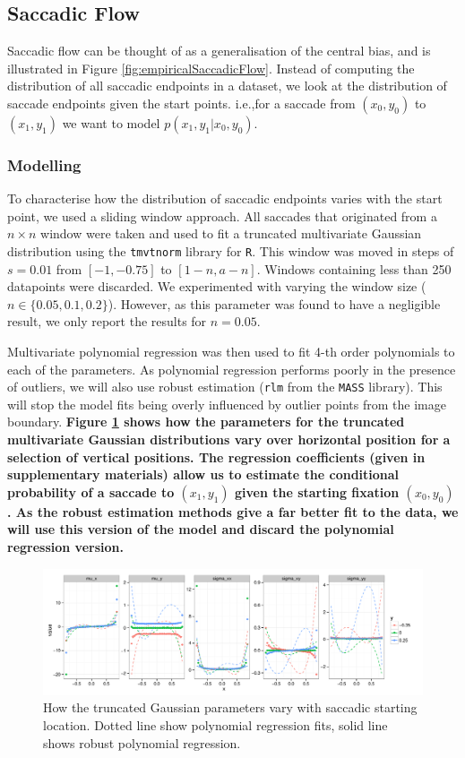 \documentclass[a4paper, twocolumn, oneside, 11pt]{article}
\begin{document}
\subsection{Saccadic Flow}
\label{ModellingFlow}

Saccadic flow can be thought of as a generalisation of the central bias, and is illustrated in Figure \ref{fig:empiricalSaccadicFlow}. Instead of computing the distribution of all saccadic endpoints in a dataset, we look at the distribution of saccade endpoints given the start points. i.e.,for a saccade from $(x_0, y_0)$ to $(x_1, y_1)$ we want to model $p(x_1,y_1|x_0, y_0)$.

\subsubsection{Modelling}

To characterise how the distribution of saccadic endpoints varies with the start point, we used a sliding window approach. All saccades that originated from a $n\times n$ window were taken and used to fit a truncated multivariate Gaussian distribution using the \texttt{tmvtnorm} library for \texttt{R}. This window was moved in steps of $s=0.01$ from $[-1,-0.75]$ to $[1-n, a-n]$. Windows containing less than 250 datapoints were discarded. We experimented with varying the window size ($n\in\{0.05,0.1, 0.2\}$). However, as this parameter was found to have a negligible result, we only report the results for $n=0.05$.

Multivariate polynomial regression was then used to fit 4-th order polynomials to each of the parameters. As polynomial regression performs poorly in the presence of outliers, we will also use robust estimation (\texttt{rlm} from the \texttt{MASS} library). This will stop the model fits being overly influenced by outlier points from the image boundary. \textbf{Figure \ref{fig:nParamsOverSpace} shows how the parameters for the truncated multivariate Gaussian distributions vary over horizontal position for a selection of vertical positions. The regression coefficients (given in supplementary materials) allow us to estimate the conditional probability of a saccade to $(x_1, y_1)$ given the starting fixation $(x_0, y_0)$. As the robust estimation methods give a far better fit to the data, we will use this version of the model and discard the polynomial regression version.}

\begin{figure}[ht]
\centering
\includegraphics[width=13cm]{../scripts/flow/figs/NparamsChagingOverSpace_ALL_tN}
\caption{How the truncated Gaussian parameters vary with saccadic starting location. Dotted line show polynomial regression fits, solid line shows robust polynomial regression.}
\label{fig:nParamsOverSpace}
\end{figure}
\end{document}
